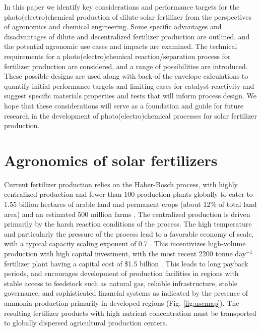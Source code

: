 In this paper we identify key considerations and performance targets for the photo(electro)chemical production of dilute solar fertilizer from the perspectives of agronomics and chemical engineering. Some specific advantages and disadvantages of dilute and decentralized fertilizer production are outlined, and the potential agronomic use cases and impacts are examined. The technical requirements for a photo(electro)chemical reaction/separation process for fertilizer production are considered, and a range of possibilities are introduced. These possible designs are used along with back-of-the-envelope calculations to quantify initial performance targets and limiting cases for catalyst reactivity and suggest specific materials properties and tests that will inform process design. We hope that these considerations will serve as a foundation and guide for future research in the development of photo(electro)chemical processes for solar fertilizer production.

\section{Agronomics of solar fertilizers}

Current fertilizer production relies on the Haber-Bosch process, with highly centralized production and fewer than 100 production plants globally \cite{McArthur_2017} to cater to 1.55 billion hectares of arable land and permanent crops (about 12\% of total land area) \cite{FAOSTAT_2018} and an estimated 500 million farms \cite{FAO_2014,Lowder_2016}. The centralized production is driven primarily by the harsh reaction conditions of the process. The high temperature and particularly the pressure of the process lead to a favorable economy of scale, with a typical capacity scaling exponent of 0.7 \cite{Ullmann_amm_2006, Berthouex_1972}. This incentivizes high-volume production with high capital investment, with the most recent 2200 tonne day$^{-1}$ fertilizer plant having a capital cost of \$1.5 billion \cite{northern_plains_2013}. This leads to long payback periods, and encourages development of production facilities in regions with stable access to feedstock such as natural gas, reliable infrastructure, stable governance, and sophisticated financial systems \cite{McArthur_2017} as indicated by the presence of ammonia production primarily in developed regions (Fig. \ref{fig:usemap}). The resulting fertilizer products with high nutrient concentration must be transported to globally dispersed agricultural production centers. 

